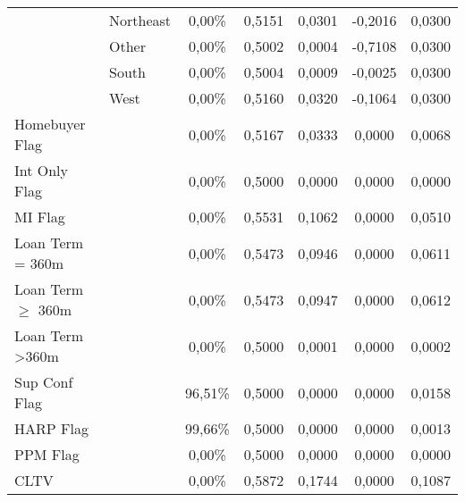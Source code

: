 {\begin{longtable}{ p{3cm} p{4cm} c c c c c}
                            & Northeast                                                         & 0,00\%  & 0,5151 & 0,0301 & -0,2016 & 0,0300 \\
                            & Other                                                             & 0,00\%  & 0,5002 & 0,0004 & -0,7108 & 0,0300 \\
                            & South                                                             & 0,00\%  & 0,5004 & 0,0009 & -0,0025 & 0,0300 \\
                            & West                                                              & 0,00\%  & 0,5160 & 0,0320 & -0,1064 & 0,0300 \\\hline
Homebuyer Flag              &                                                                   & 0,00\%  & 0,5167 & 0,0333 & 0,0000  & 0,0068 \\
Int Only Flag               &                                                                   & 0,00\%  & 0,5000 & 0,0000 & 0,0000  & 0,0000 \\
MI Flag                     &                                                                   & 0,00\%  & 0,5531 & 0,1062 & 0,0000  & 0,0510 \\
Loan Term = 360m            &                                                                   & 0,00\%  & 0,5473 & 0,0946 & 0,0000  & 0,0611 \\
Loan Term $\geq$ 360m       &                                                                   & 0,00\%  & 0,5473 & 0,0947 & 0,0000  & 0,0612 \\
Loan Term \textgreater 360m &                                                                   & 0,00\%  & 0,5000 & 0,0001 & 0,0000  & 0,0002 \\
Sup Conf Flag               &                                                                   & 96,51\% & 0,5000 & 0,0000 & 0,0000  & 0,0158 \\
HARP Flag                   &                                                                   & 99,66\% & 0,5000 & 0,0000 & 0,0000  & 0,0013 \\
PPM Flag                    &                                                                   & 0,00\%  & 0,5000 & 0,0000 & 0,0000  & 0,0000 \\\hline
CLTV                        &                                                                   & 0,00\%  & 0,5872 & 0,1744 & 0,0000  & 0,1087 \\

\end{longtable}}
